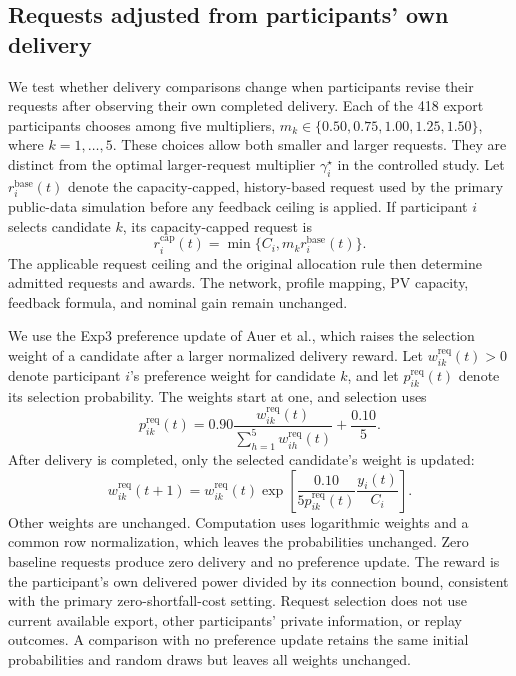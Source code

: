 \documentclass[11pt]{article}
\begin{document}
\subsection{Requests adjusted from participants' own delivery}
\label{supp:experiential_requests}

We test whether delivery comparisons change when participants revise their
requests after observing their own completed delivery. Each of the 418 export
participants chooses among five multipliers,
$m_k\in\{0.50,0.75,1.00,1.25,1.50\}$, where $k=1,\ldots,5$.
These choices allow both smaller and larger requests. They are distinct from
the optimal larger-request multiplier $\gamma_i^\star$ in the controlled study.
Let $r_i^{\mathrm{base}}(t)$ denote the capacity-capped, history-based request
used by the primary public-data simulation before any feedback ceiling is
applied. If participant $i$ selects candidate $k$, its capacity-capped request is
\begin{equation}
 r_i^{\mathrm{cap}}(t)=\min\{C_i,m_k r_i^{\mathrm{base}}(t)\}.
 \label{eq:supp_experiential_request}
\end{equation}
The applicable request ceiling and the original allocation rule then determine
admitted requests and awards. The network, profile mapping, PV capacity,
feedback formula, and nominal gain remain unchanged.

We use the Exp3 preference update of Auer et al., which raises the selection weight of a candidate after a larger
normalized delivery reward.\cite{Auer2002Exp3}
Let $w^{\mathrm{req}}_{ik}(t)>0$ denote participant $i$'s preference weight for candidate $k$,
and let $p^{\mathrm{req}}_{ik}(t)$ denote its selection probability. The weights start at one,
and selection uses
\begin{equation}
 p^{\mathrm{req}}_{ik}(t)=0.90\frac{w^{\mathrm{req}}_{ik}(t)}{\sum_{h=1}^{5}w^{\mathrm{req}}_{ih}(t)}+\frac{0.10}{5}.
 \label{eq:supp_experiential_probability}
\end{equation}
After delivery is completed, only the selected candidate's weight is updated:
\begin{equation}
 w^{\mathrm{req}}_{ik}(t+1)=w^{\mathrm{req}}_{ik}(t)
 \exp\!\left[\frac{0.10}{5p^{\mathrm{req}}_{ik}(t)}\frac{y_i(t)}{C_i}\right].
 \label{eq:supp_experiential_update}
\end{equation}
Other weights are unchanged. Computation uses logarithmic weights and a common
row normalization, which leaves the probabilities unchanged. Zero baseline
requests produce zero delivery and no preference update. The reward is the
participant's own delivered power divided by its connection bound, consistent
with the primary zero-shortfall-cost setting. Request selection does not use
current available export, other participants' private information, or replay
outcomes. A comparison with no preference update retains the same initial
probabilities and random draws but leaves all weights unchanged.
\end{document}
